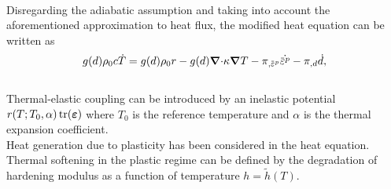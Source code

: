 \begin{frame}{}
 \\
Disregarding the adiabatic assumption and taking into account the aforementioned approximation to heat flux, the modified heat equation can be written as
\begin{align}
    g(d) \rho_0 c \dot{T} = g(d) \rho_0 r - g(d) \divergence \kappa \grad T - \pi_{, \plasticstrain} \dot{\plasticstrain} - \pi_{, d} \dot{d},
\end{align}\\
\bigskip
Thermal-elastic coupling can be introduced by an inelastic potential $r(T;T_0,\alpha) \operatorname{tr}(\boldsymbol{\varepsilon})$ where $T_0$ is the reference temperature and $\alpha$ is the thermal expansion coefficient. \\
\bigskip
Heat generation due to plasticity has been considered in the heat equation. Thermal softening in the plastic regime can be defined by the degradation of hardening modulus as a function of temperature $h = \widetilde{h}(T)$.
\end{frame}
